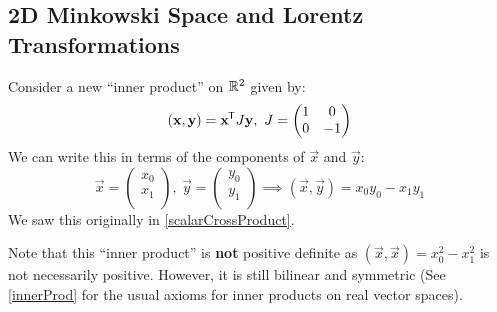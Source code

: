 \documentclass[../main.tex]{subfiles}
\begin{document}
\subsection{2D Minkowski Space and Lorentz Transformations}
Consider a new ``inner product'' on $\mathbb{R}^2$ given by:
\[
  (\vec{x}, \vec{y}) = \vec{x}^{\trans} J \vec{y},\ J = \begin{pmatrix}
  1 & 0 \\
  0 & -1 \\
  \end{pmatrix}
\]
We can write this in terms of the components of $\vec{x}$ and $\vec{y}$:
\[
  \vec{x} = \begin{pmatrix}
  x_0 \\
  x_1 \\
  \end{pmatrix},\
  \vec{y} = \begin{pmatrix}
  y_0 \\
  y_1 \\
  \end{pmatrix} \implies (\vec{x}, \vec{y}) = x_0 y_0 - x_1 y_1
\]
We saw this originally in \cref{scalarCrossProduct}.

Note that this ``inner product'' is \textbf{not} positive definite as $(\vec{x}, \vec{x}) = x^2_0 - x^2_1$ is not necessarily positive.
However, it is still bilinear and symmetric (See \cref{innerProd} for the usual axioms for inner products on real vector spaces).
\end{document}
